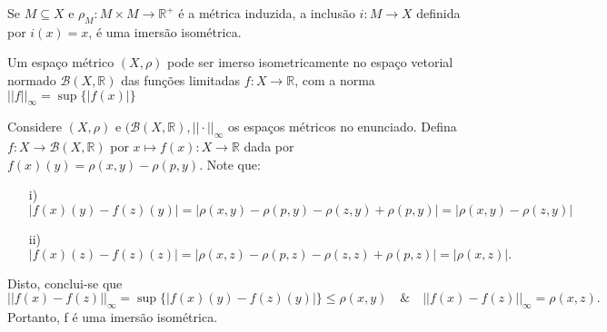 \documentclass[metric_notes.tex]{subfiles}
\begin{document}
\begin{example}
	Se \(M\subseteq{X}\) e \(\rho _{M}:M\times M\rightarrow \mathbb{R}^{+}\) é a métrica induzida, a inclusão
	\(i:M\rightarrow X\) definida por \(i(x) = x\), é uma imersão isométrica.
\end{example}
\begin{prop*}
	Um espaço métrico \((X, \rho )\) pode ser imerso isometricamente no espaço vetorial normado \(\mathcal{B}(X, \mathbb{R})\) das funções limitadas \(f:X\rightarrow \mathbb{R}\), com a norma
	\(||f||_{\infty}=\sup\{|f(x)|\}\)
\end{prop*}
\begin{proof*}
	Considere \((X, \rho )\) e \((\mathcal{B}(X, \mathbb{R}), ||\cdot ||_{\infty}\) os espaços métricos no enunciado. Defina
	\(f:X\rightarrow \mathcal{B}(X, \mathbb{R})\) por \(x\mapsto f(x):X\rightarrow \mathbb{R}\) dada por
	\(f(x)(y) = \rho (x, y)-\rho (p, y).\) Note que:
	\begin{itemize}
		\item[i)] \(|f(x)(y) - f(z)(y)| = |\rho (x, y)-\rho (p, y)-\rho (z, y) + \rho (p, y)| = |\rho (x, y)-\rho (z, y)|\)
		\item[ii)] \(|f(x)(z)-f(z)(z)| = |\rho (x, z) - \rho (p, z) - \rho (z, z) + \rho (p,z)| = |\rho (x, z)|.\)
	\end{itemize}
	Disto, conclui-se que
	\[
		||f(x)-f(z)||_{\infty} = \sup\{|f(x)(y) - f(z)(y)|\}\leq \rho (x, y)\quad\&\quad ||f(x)-f(z)||_{\infty} = \rho (x, z).
	\]
	Portanto, f é uma imersão isométrica. \qedsymbol
\end{proof*}
\end{document}
